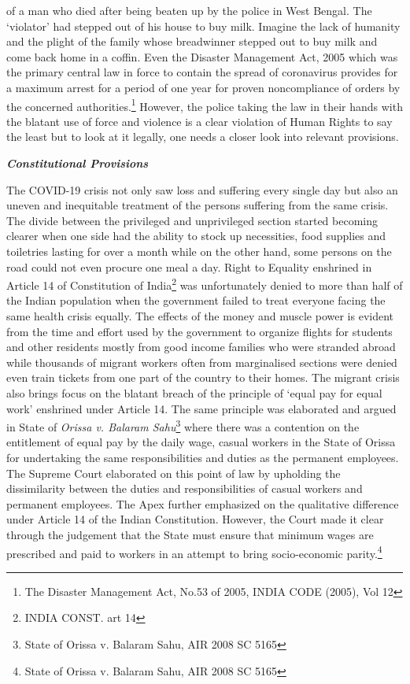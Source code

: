 \begin{multicols}{2}
of a man who died after being beaten up by the police in West Bengal. The ‘violator’ had
stepped out of his house to buy milk. Imagine the lack of humanity and the plight of the
family whose breadwinner stepped out to buy milk and come back home in a coffin. Even the
Disaster Management Act, 2005 which was the primary central law in force to contain the
spread of coronavirus provides for a maximum arrest for a period of one year for proven noncompliance of orders by the concerned authorities.\footnote{The Disaster Management Act, No.53 of 2005, INDIA CODE (2005), Vol 12} However, the police taking the law in
their hands with the blatant use of force and violence is a clear violation of Human Rights to
say the least but to look at it legally, one needs a closer look into relevant provisions. 


\noi
{\large\it\bfseries{Constitutional Provisions}}

\noi
The COVID-19 crisis not only saw loss and suffering every single day but also an uneven and
inequitable treatment of the persons suffering from the same crisis. The divide between the
privileged and unprivileged section started becoming clearer when one side had the ability to
stock up necessities, food supplies and toiletries lasting for over a month while on the other hand, some persons on the road could not even procure one meal a day. Right to Equality
enshrined in Article 14 of Constitution of India\footnote{INDIA CONST. art 14 } was unfortunately denied to more than half
of the Indian population when the government failed to treat everyone facing the same health
crisis equally. The effects of the money and muscle power is evident from the time and effort
used by the government to organize flights for students and other residents mostly from good
income families who were stranded abroad while thousands of migrant workers often from
marginalised sections were denied even train tickets from one part of the country to their
homes. The migrant crisis also brings focus on the blatant breach of the principle of ‘equal
pay for equal work’ enshrined under Article 14. The same principle was elaborated and
argued in State of \textit{Orissa v. Balaram Sahu}\footnote{State of Orissa v. Balaram Sahu, AIR 2008 SC 5165} where there was a contention on the entitlement
of equal pay by the daily wage, casual workers in the State of Orissa for undertaking the same
responsibilities and duties as the permanent employees. The Supreme Court elaborated on
this point of law by upholding the dissimilarity between the duties and responsibilities of
casual workers and permanent employees. The Apex further emphasized on the qualitative
difference under Article 14 of the Indian Constitution. However, the Court made it clear
through the judgement that the State must ensure that minimum wages are prescribed and
paid to workers in an attempt to bring socio-economic parity.\footnote{State of Orissa v. Balaram Sahu, AIR 2008 SC 5165}


\end{multicols}
